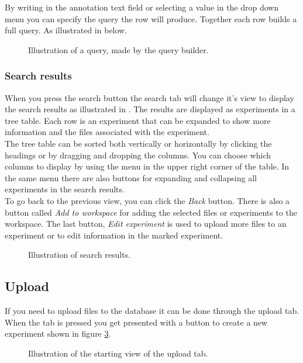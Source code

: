 By writing in the annotation text field or selecting a value in the drop down menu you can specify the query the row will produce. Together each row builds a full query. As illustrated in  below.
\begin{figure}[htb]
	\caption{Illustration of a query, made by the query builder.}
	\label{fig:des_search-query}
\end{figure}
\FloatBarrier
\subsubsection{Search results}
When you press the search button the search tab will change it's view to display the search results as illustrated in . The results are displayed as experiments in a tree table. Each row is an experiment that can be expanded to show more information and the files associated with the experiment. \\

The tree table can be sorted both vertically or horizontally by clicking the headings or by dragging and dropping the columns. You can choose which columns to display by using the menu in the upper right corner of the table. In the same menu there are also buttons for expanding and collapsing all experiments in the search results. \\

To go back to the previous view, you can click the \emph{Back} button. There is also a button called \emph{Add to workspace} for adding the selected files or experiments to the workspace. The last button, \emph{Edit experiment} is used to upload more files to an experiment or to edit information in the marked experiment.

\begin{figure}[htb]
	\caption{Illustration of search results.}
	\label{fig:des_search-results}
\end{figure}
\FloatBarrier

\subsection{Upload}
If you need to upload files to the database it can be done through the upload tab. When the tab is pressed you get presented with a button to create a new experiment shown in figure \ref{fig:des_upload-tab}.

\begin{figure}[h!]
	\caption{Illustration of the starting view of the upload tab.}
	\label{fig:des_upload-tab}
\end{figure}
